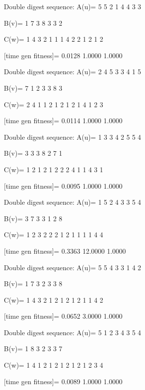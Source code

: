 Double digest sequence:
A(u)=
     5     5     2     1     4     4     3     3

B(v)=
     1     7     3     8     3     3     2

C(w)=
     1     4     3     2     1     1     1     4     2     2     1     2     1     2

[time gen fitness]=
    0.0128    1.0000    1.0000

Double digest sequence:
A(u)=
     2     4     5     3     3     4     1     5

B(v)=
     7     1     2     3     3     8     3

C(w)=
     2     4     1     1     2     1     2     1     2     1     4     1     2     3

[time gen fitness]=
    0.0114    1.0000    1.0000

Double digest sequence:
A(u)=
     1     3     3     4     2     5     5     4

B(v)=
     3     3     3     8     2     7     1

C(w)=
     1     2     1     2     1     2     2     2     4     1     1     4     3     1

[time gen fitness]=
    0.0095    1.0000    1.0000

Double digest sequence:
A(u)=
     1     5     2     4     3     3     5     4

B(v)=
     3     7     3     3     1     2     8

C(w)=
     1     2     3     2     2     2     1     2     1     1     1     1     4     4

[time gen fitness]=
    0.3363   12.0000    1.0000

Double digest sequence:
A(u)=
     5     5     4     3     3     1     4     2

B(v)=
     1     7     3     2     3     3     8

C(w)=
     1     4     3     2     1     2     1     2     1     2     1     1     4     2

[time gen fitness]=
    0.0652    3.0000    1.0000

Double digest sequence:
A(u)=
     5     1     2     3     4     3     5     4

B(v)=
     1     8     3     2     3     3     7

C(w)=
     1     4     1     2     1     2     1     2     1     2     1     2     3     4

[time gen fitness]=
    0.0089    1.0000    1.0000

